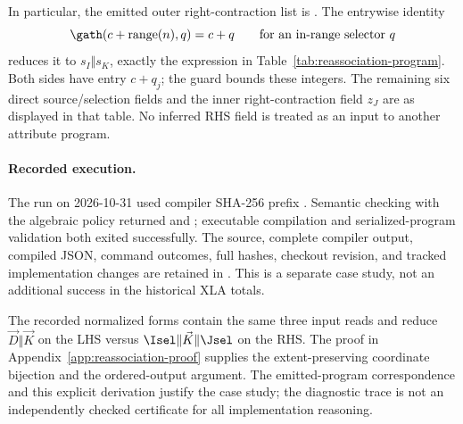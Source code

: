 In particular, the emitted outer right-contraction list is
. The entrywise identity
\begin{equation}
 \gath(c+\operatorname{range}(n),q)=c+q
 \qquad\text{for an in-range selector }q
 \label{eq:shifted-range-selection}
\end{equation}
reduces it to $s_I\Vert s_K$, exactly the expression in
Table~\ref{tab:reassociation-program}. Both sides have entry $c+q_j$;
the guard bounds these integers. The remaining six direct source/selection
fields and the inner right-contraction field $z_J$ are as displayed in
that table. No inferred RHS field is treated as an input to another
attribute program.

\paragraph{Recorded execution.}
The run on 2026-10-31 used compiler SHA-256 prefix
. Semantic checking with the algebraic policy returned
 and ; executable compilation
and serialized-program validation both exited successfully. The source,
complete compiler output, compiled JSON, command outcomes, full hashes,
checkout revision, and tracked implementation changes are retained in
. This is a separate case study, not an
additional success in the historical XLA totals.

The recorded normalized forms contain the same three input reads and
reduce $\vec D\Vert \vec K$ on the LHS versus $\Isel\Vert \vec K\Vert\Jsel$ on the RHS.
The proof in Appendix~\ref{app:reassociation-proof} supplies the
extent-preserving coordinate bijection and the ordered-output argument.
The emitted-program correspondence and this explicit derivation justify
the case study; the diagnostic trace is not an independently checked
certificate for all implementation reasoning.
